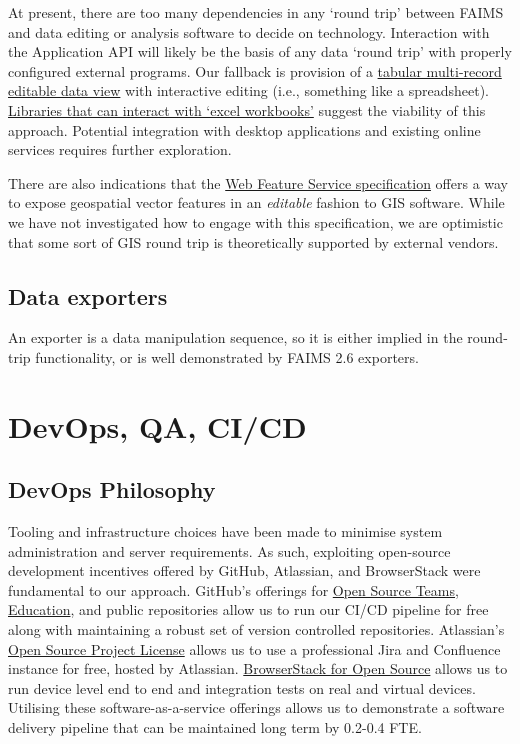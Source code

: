 \documentclass[a4paper,headings=small fontsize=10pt]{scrreprt}
\begin{document}
At present, there are too many dependencies in any `round trip' between
FAIMS and data editing or analysis software to decide on technology.
Interaction with the Application API will likely be the basis of any
data `round trip' with properly configured external programs. Our
fallback is provision of a
\href{https://www.npmjs.com/package/editable-table}{{tabular
multi-record editable data view}} with interactive editing (i.e.,
something like a spreadsheet).
\href{https://www.npmjs.com/package/xlsx}{{Libraries that can interact
with `excel workbooks'}} suggest the viability of this approach.
Potential integration with desktop applications and existing online
services requires further exploration.

There are also indications that the
\href{https://www.ogc.org/standards/wfs}{{Web Feature Service
specification}} offers a way to expose geospatial vector features in an
\emph{editable} fashion to GIS software. While we have not investigated
how to engage with this specification, we are optimistic that some sort
of GIS round trip is theoretically supported by external vendors.

\subsection{Data exporters}

An exporter is a data manipulation sequence, so it is either implied in
the round-trip functionality, or is well demonstrated by FAIMS 2.6
exporters.

\section{DevOps, QA, CI/CD}

\subsection{DevOps Philosophy}

Tooling and infrastructure choices have been made to minimise system
administration and server requirements. As such, exploiting open-source
development incentives offered by GitHub, Atlassian, and BrowserStack
were fundamental to our approach. GitHub's offerings for
\href{https://github.com/account/organizations/new?plan=free\&ref_cta=Sign\%2520up\%2520your\%2520team\&ref_loc=changing\%2520the\%2520world\&ref_page=\%2Fpricing\&source=pricing-open-source}{{Open
Source Teams}}, \href{https://education.github.com}{{Education}}, and
public repositories allow us to run our CI/CD pipeline for free along
with maintaining a robust set of version controlled repositories.
Atlassian's
\href{https://www.atlassian.com/software/views/open-source-license-request}{{Open
Source Project License}} allows us to use a professional Jira and
Confluence instance for free, hosted by Atlassian.
\href{https://www.browserstack.com/open-source}{{BrowserStack for Open
Source}} allows us to run device level end to end and integration tests
on real and virtual devices. Utilising these software-as-a-service
offerings allows us to demonstrate a software delivery pipeline that can
be maintained long term by 0.2-0.4 FTE.
\end{document}
